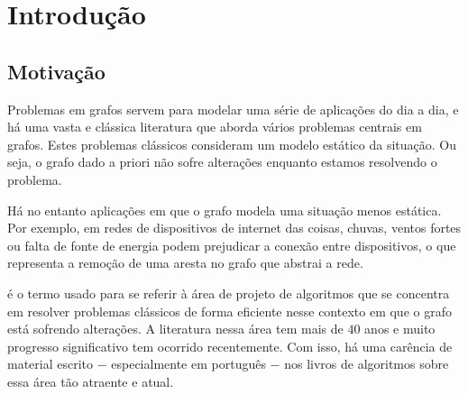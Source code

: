 \chapter{Introdução}

\section{Motivação}
\label{sec:Motivação}

Problemas em grafos servem para modelar uma série de aplicações do dia a dia,
e há uma vasta e clássica literatura que aborda vários problemas centrais em grafos. Estes problemas clássicos consideram um modelo estático da situação. Ou seja, o grafo dado a priori não sofre alterações enquanto estamos resolvendo o problema.

Há no entanto aplicações em que o grafo modela uma situação menos estática. Por exemplo, em redes de dispositivos de internet das coisas, chuvas, ventos fortes ou falta de fonte de energia podem prejudicar a conexão entre dispositivos, o que representa a remoção de uma aresta no grafo que abstrai a rede.

 é o termo usado para se referir à área de projeto de algoritmos que se concentra em resolver problemas clássicos de forma eficiente nesse contexto em que o grafo está sofrendo alterações. A literatura nessa área tem mais de $40$ anos e muito progresso significativo tem ocorrido recentemente.  Com isso, há uma carência de material escrito $-$ especialmente em português $-$ nos livros de algoritmos sobre essa área tão atraente e atual.

